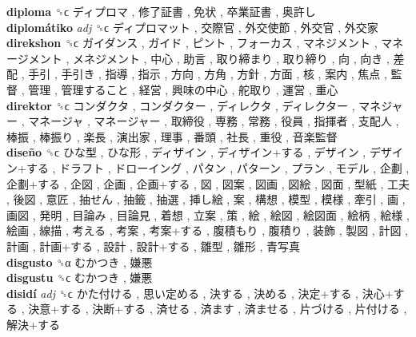 \textbf{diploma} ␝ϲ   ディプロマ ,  修了証書 ,  免状 ,  卒業証書 ,  奥許し   \\
\textbf{diplomátiko} \emph{adj}  ␝ϲ   ディプロマット ,  交際官 ,  外交使節 ,  外交官 ,  外交家   \\
\textbf{direkshon} ␝ϲ   ガイダンス ,  ガイド ,  ピント ,  フォーカス ,  マネジメント ,  マネージメント ,  メネジメント ,  中心 ,  助言 ,  取り締まり ,  取り締り ,  向 ,  向き ,  差配 ,  手引 ,  手引き ,  指導 ,  指示 ,  方向 ,  方角 ,  方針 ,  方面 ,  核 ,  案内 ,  焦点 ,  監督 ,  管理 ,  管理すること ,  経営 ,  興味の中心 ,  舵取り ,  運営 ,  重心   \\
\textbf{direktor} ␝ϲ   コンダクタ ,  コンダクター ,  ディレクタ ,  ディレクター ,  マネジャー ,  マネージャ ,  マネージャー ,  取締役 ,  専務 ,  常務 ,  役員 ,  指揮者 ,  支配人 ,  棒振 ,  棒振り ,  楽長 ,  演出家 ,  理事 ,  番頭 ,  社長 ,  重役 ,  音楽監督   \\
\textbf{diseño} ␝ϲ   ひな型 ,  ひな形 ,  ディザイン ,  ディザイン+する ,  デザイン ,  デザイン+する ,  ドラフト ,  ドローイング ,  パタン ,  パターン ,  プラン ,  モデル ,  企劃 ,  企劃+する ,  企図 ,  企画 ,  企画+する ,  図 ,  図案 ,  図画 ,  図絵 ,  図面 ,  型紙 ,  工夫 ,  後図 ,  意匠 ,  抽せん ,  抽籤 ,  抽選 ,  挿し絵 ,  案 ,  構想 ,  模型 ,  模様 ,  牽引 ,  画 ,  画図 ,  発明 ,  目論み ,  目論見 ,  着想 ,  立案 ,  策 ,  絵 ,  絵図 ,  絵図面 ,  絵柄 ,  絵様 ,  絵画 ,  線描 ,  考える ,  考案 ,  考案+する ,  腹積もり ,  腹積り ,  装飾 ,  製図 ,  計図 ,  計画 ,  計画+する ,  設計 ,  設計+する ,  雛型 ,  雛形 ,  青写真   \\
\textbf{disgusto} ␝α   むかつき ,  嫌悪   \\
\textbf{disgustu} ␝ϲ   むかつき ,  嫌悪   \\
\textbf{disidí} \emph{adj}  ␝ϲ   かた付ける ,  思い定める ,  決する ,  決める ,  決定+する ,  決心+する ,  決意+する ,  決断+する ,  済せる ,  済ます ,  済ませる ,  片づける ,  片付ける ,  解決+する   \\
